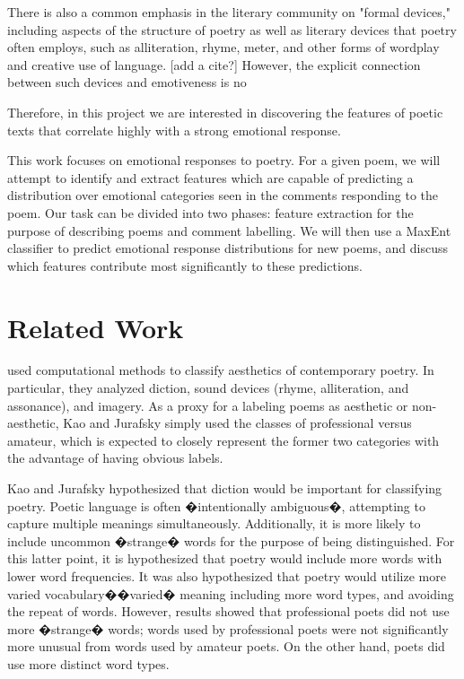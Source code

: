 \documentclass[11pt]{article}
\begin{document}
There is also a common emphasis in the literary community on "formal devices," including aspects of the structure of poetry as well as literary devices that poetry often employs, such as alliteration, rhyme, meter, and other forms of wordplay and creative use of language. [add a cite?] However, the explicit connection between such devices and emotiveness is no

Therefore, in this project we are interested in discovering the features of poetic texts that correlate highly with a strong emotional response.


This work focuses on emotional responses to poetry. For a given poem, we will attempt to identify and extract features which are capable of predicting a distribution over emotional categories seen in the comments responding to the poem. Our task can be divided into two phases: feature extraction for the purpose of describing poems and comment labelling. We will then use a MaxEnt classifier to predict emotional response distributions for new poems, and discuss which features contribute most significantly to these predictions.



\section{Related Work}


 used computational methods to classify aesthetics of contemporary poetry. In particular, they analyzed diction, sound devices (rhyme, alliteration, and assonance), and imagery. As a proxy for a labeling poems as aesthetic or non-aesthetic, Kao and Jurafsky simply used the classes of professional versus amateur, which is expected to closely represent the former two categories with the advantage of having obvious labels.

Kao and Jurafsky hypothesized that diction would be important for classifying poetry. Poetic language is often �intentionally ambiguous�, attempting to capture multiple meanings simultaneously. Additionally, it is more likely to include uncommon �strange� words for the purpose of being distinguished. For this latter point, it is hypothesized that poetry would include more words with lower word frequencies. It was also hypothesized that poetry would utilize more varied vocabulary��varied� meaning including more word types, and avoiding the repeat of words. However, results showed that professional poets did not use more �strange� words; words used by professional poets were not significantly more unusual from words used by amateur poets. On the other hand, poets did use more distinct word types.
\end{document}
